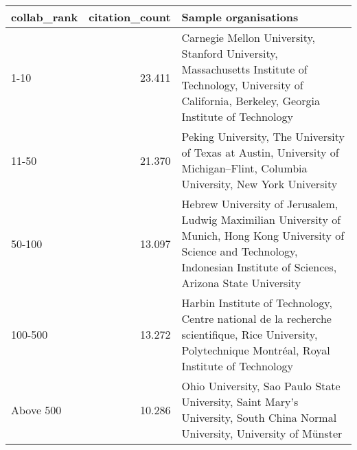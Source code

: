 \begin{tabular}{lrl}
\toprule
collab\_rank &  citation\_count &                                                                                                                                                                Sample organisations \\
\midrule
       1-10 &          23.411 &                         Carnegie Mellon University, Stanford University, Massachusetts Institute of Technology, University of California, Berkeley, Georgia Institute of Technology \\
      11-50 &          21.370 &                                                        Peking University, The University of Texas at Austin, University of Michigan–Flint, Columbia University, New York University \\
     50-100 &          13.097 &  Hebrew University of Jerusalem, Ludwig Maximilian University of Munich, Hong Kong University of Science and Technology, Indonesian Institute of Sciences, Arizona State University \\
    100-500 &          13.272 &                                Harbin Institute of Technology, Centre national de la recherche scientifique, Rice University, Polytechnique Montréal, Royal Institute of Technology \\
  Above 500 &          10.286 &                                                          Ohio University, Sao Paulo State University, Saint Mary's University, South China Normal University, University of Münster \\
\bottomrule
\end{tabular}
